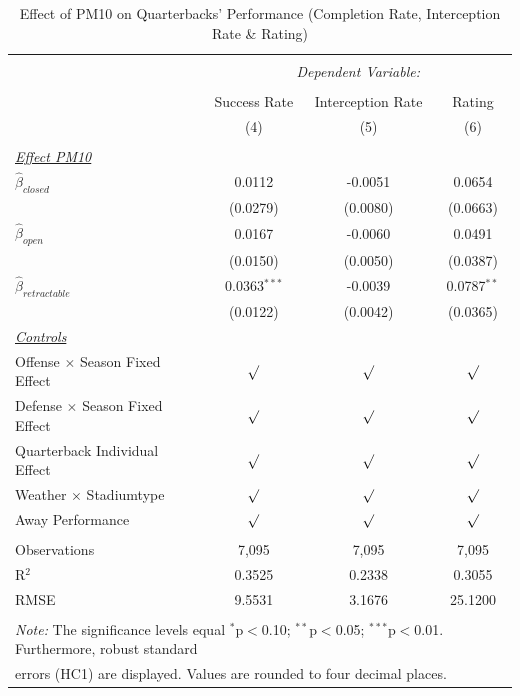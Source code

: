\documentclass[12pt,a4paper]{article}
\begin{document}
{\begin{table}[!htbp] \centering 
  \caption{Effect of PM10 on Quarterbacks' Performance (Completion Rate, Interception Rate \& Rating)} 
  \label{T1} 
\begin{tabular}{@{\extracolsep{5pt}}lccc} 
\\[-1.8ex]\hline 
\hline \\[-1.8ex] 
 & \multicolumn{3}{c}{\textit{Dependent Variable:}} \\ \cline{2-4} \\ [-1.8ex]
 & Success Rate & Interception Rate & Rating \\ 
  & (4) & (5) & (6)\\ \hline \\[-1.8ex] 
 \underline{\textit{Effect PM10}}\\[0.4cm]
  $\hat{\beta}_{closed}$& 0.0112  & -0.0051 & 0.0654 \\ 
  & (0.0279)  & (0.0080)& (0.0663) \\[0.4cm]
  $\hat{\beta}_{open}$&  0.0167 & -0.0060 & 0.0491\\ 
  & (0.0150) & (0.0050) & (0.0387) \\[0.4cm]
  $\hat{\beta}_{retractable}$& 0.0363$^{***}$ & -0.0039 & 0.0787$^{**}$\\ 
  & (0.0122) & (0.0042) & (0.0365)\\ [0.4cm]
  \underline{\textit{Controls}} \\[0.4cm]
  Offense $\times$ Season Fixed Effect & $\surd$ & $\surd$ & $\surd$ \\[0.4cm]
   Defense $\times$ Season Fixed Effect & $\surd$ & $\surd$  & $\surd$ \\[0.4cm]
    Quarterback Individual Effect & $\surd$ & $\surd$ & $\surd$  \\[0.4cm]
    Weather $\times $ Stadiumtype & $\surd$ & $\surd$ & $\surd$ \\[0.4cm]
    Away Performance & $\surd$ & $\surd$ & $\surd$\\
\hline \\[-1.8ex] 
Observations & 7,095 & 7,095 & 7,095 \\ 
R$^{2}$ & 0.3525 & 0.2338   &  0.3055 \\ 
RMSE & 9.5531 & 3.1676  & 25.1200 \\ \hline 
\hline \\[-1.8ex] 
\multicolumn{4}{l}{\footnotesize \textit{Note:} The significance levels equal {$^{*}$p$<$0.10; $^{**}$p$<$0.05; $^{***}$p$<$0.01}.  Furthermore, robust  standard} \\ \multicolumn{4}{l}{\footnotesize errors (HC1) are displayed. Values are rounded to four decimal places.}

\end{tabular}
\end{table}}
\end{document}
